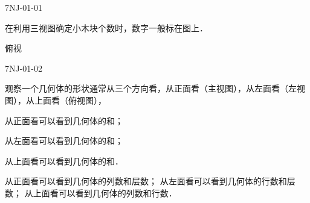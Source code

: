
\begin{defproblem}{7NJ-01-01}%
\begin{onlyproblem}%
在利用三视图确定小木块个数时，数字一般标在\underline{\hspace*{2cm}}图上．

\end{onlyproblem}%
\begin{onlysolution}%
\begin{solution}%
俯视
\end{solution}%
\end{onlysolution}%
\end{defproblem}





\begin{defproblem}{7NJ-01-02}%
\begin{onlyproblem}%
观察一个几何体的形状通常从三个方向看，从正面看（主视图），从左面看（左视图），从上面看（俯视图），

从正面看可以看到几何体的\underline{\hspace*{2cm}}和\underline{\hspace*{2cm}}；

从左面看可以看到几何体的\underline{\hspace*{2cm}}和\underline{\hspace*{2cm}}；

从上面看可以看到几何体的\underline{\hspace*{2cm}}和\underline{\hspace*{2cm}}．
\end{onlyproblem}%
\begin{onlysolution}%
\begin{solution}%
从正面看可以看到几何体的列数和层数；
从左面看可以看到几何体的行数和层数；
从上面看可以看到几何体的列数和行数．
\end{solution}%
\end{onlysolution}%
\end{defproblem}




